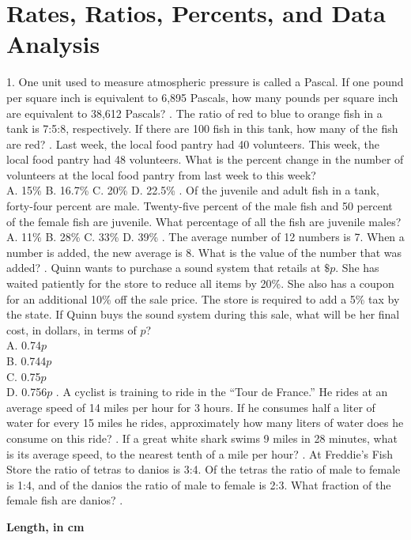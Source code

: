 \documentclass[../satmath.tex]{subfiles}
\begin{document}
\chapter{Rates, Ratios, Percents, and Data Analysis}
1. One unit used to measure atmospheric pressure is called a Pascal. If one pound per square inch is equivalent to 6,895 Pascals, how many 
pounds per square inch are equivalent to 38,612 Pascals?
. The ratio of red to blue to orange fish in a tank is 7:5:8, respectively. If there are 100 fish in this tank, how many of the fish are red?
. Last week, the local food pantry had 40 volunteers. This week, the local food pantry had 48 volunteers. What is the percent change in the number 
of volunteers at the local food pantry from last week to this week?\\
A. 15\% \quad B. 16.7\% \quad C. 20\% \quad D. 22.5\%
. Of the juvenile and adult fish in a tank, forty-four percent are male. Twenty-five percent of the male fish and 50 percent of the female fish 
are juvenile. What percentage of all the fish are juvenile males?\\
A. 11\% \quad B. 28\% \quad C. 33\% \quad D. 39\% 
. The average number of 12 numbers is 7. When a number is added, the new average is 8. What is the value of the number that was added?
. Quinn wants to purchase a sound system that retails at $\$p$. She has waited patiently for the store to reduce all items by 20\%. She also 
has a coupon for an additional 10\% off the sale price. The store is required to add a 5\% tax by the state. If Quinn buys the sound system during this sale, 
what will be her final cost, in dollars, in terms of $p$?\\
A. 0.74$p$\\
B. 0.744$p$\\
C. 0.75$p$\\
D. 0.756$p$
. A cyclist is training to ride in the ``Tour de France.'' He rides at an average speed of 14 miles per hour for 3 hours. If he consumes half a liter 
of water for every 15 miles he rides, approximately how many liters of water does he consume on this ride?
. If a great white shark swims 9 miles in 28 minutes, what is its average speed, to the nearest tenth of a mile per hour?
. At Freddie's Fish Store the ratio of tetras to danios is 3:4. Of the tetras the ratio of male to female is 1:4, and of the danios 
the ratio of male to female is 2:3. What fraction of the female fish are danios?
. 
\begin{center}
    \textbf{Length, in cm}
\end{center}
\end{document}
